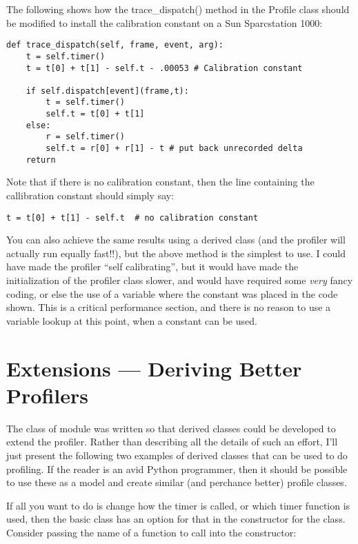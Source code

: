 The following shows how the trace_dispatch() method in the Profile
class should be modified to install the calibration constant on a Sun
Sparcstation 1000:

\bcode\begin{verbatim}
def trace_dispatch(self, frame, event, arg):
    t = self.timer()
    t = t[0] + t[1] - self.t - .00053 # Calibration constant

    if self.dispatch[event](frame,t):
        t = self.timer()
        self.t = t[0] + t[1]
    else:
        r = self.timer()
        self.t = r[0] + r[1] - t # put back unrecorded delta
    return
\end{verbatim}\ecode
%
Note that if there is no calibration constant, then the line
containing the callibration constant should simply say:

\bcode\begin{verbatim}
t = t[0] + t[1] - self.t  # no calibration constant
\end{verbatim}\ecode
%
You can also achieve the same results using a derived class (and the
profiler will actually run equally fast!!), but the above method is
the simplest to use.  I could have made the profiler ``self
calibrating'', but it would have made the initialization of the
profiler class slower, and would have required some \emph{very} fancy
coding, or else the use of a variable where the constant 
was placed in the code shown.  This is a  critical
performance section, and there is no reason to use a variable lookup
at this point, when a constant can be used.


\section{Extensions --- Deriving Better Profilers}

The  class of module  was written so that
derived classes could be developed to extend the profiler.  Rather
than describing all the details of such an effort, I'll just present
the following two examples of derived classes that can be used to do
profiling.  If the reader is an avid Python programmer, then it should
be possible to use these as a model and create similar (and perchance
better) profile classes.

If all you want to do is change how the timer is called, or which
timer function is used, then the basic class has an option for that in
the constructor for the class.  Consider passing the name of a
function to call into the constructor:

